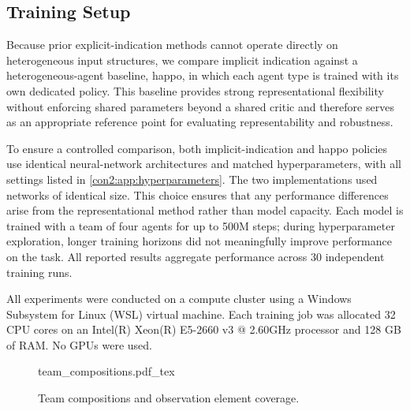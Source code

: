 \subsection{Training Setup}

Because prior explicit-indication methods cannot operate directly on
heterogeneous input structures, we compare implicit indication against a 
heterogeneous-agent baseline, \gls{happo}, in which each agent type is trained
with its own dedicated policy. This baseline provides strong representational
flexibility without enforcing shared parameters beyond a shared critic and
therefore serves as an appropriate reference point for evaluating
representability and robustness.

To ensure a controlled comparison, both implicit-indication and \gls{happo}
policies use identical neural-network architectures and matched hyperparameters, 
with all settings listed in \cref{con2:app:hyperparameters}. 
The two implementations used networks of identical size.
This choice ensures that any performance differences arise from 
the representational method rather than model capacity.
Each model is trained with a team of four agents for up to 500M steps; 
during hyperparameter exploration, 
longer training horizons did not meaningfully improve performance on the task.
All reported results aggregate performance across 30 independent training runs.  

All experiments were conducted on a compute cluster using a Windows Subsystem 
for Linux (WSL) virtual machine. Each training job was allocated 32 CPU cores on an 
Intel(R) Xeon(R) E5-2660 v3 @ 2.60GHz processor and 128 GB of RAM. No GPUs were used.

\begin{figure}
    \begin{center}
        {team_compositions.pdf_tex}
    \end{center}
    \caption{Team compositions and observation element coverage.}
    \label{con2:fig:team_compositions}
\end{figure}

